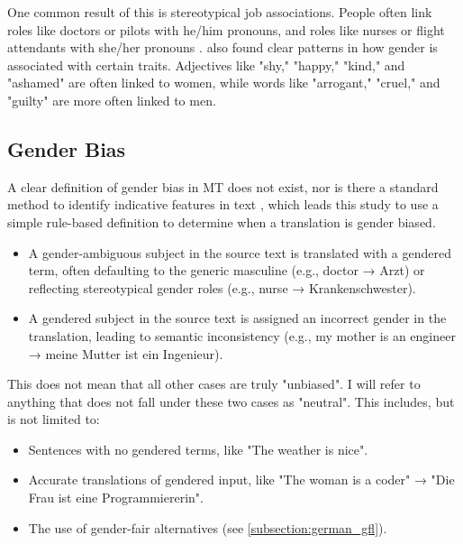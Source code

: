         One common result of this is stereotypical job associations. People often link roles like doctors or pilots with he/him pronouns, and roles like nurses or flight attendants with she/her pronouns \parencite{shresthaExploringGenderBiases2022}. \textcite{pratesAssessingGenderBias2019} also found clear patterns in how gender is associated with certain traits. Adjectives like "shy," "happy," "kind," and "ashamed" are often linked to women, while words like "arrogant," "cruel," and "guilty" are more often linked to men. 

  
 \subsection{Gender Bias} \label{subsection:definition_gb}
    A clear definition of gender bias in MT does not exist, nor is there a standard method to identify indicative features in text \parencite{barclayInvestigatingMarkersDrivers2024a}, which leads this study to use a simple rule-based definition to determine when a translation is gender biased.

        \begin{itemize}
        \item A gender-ambiguous subject in the source text is translated with a gendered term, often defaulting to the generic masculine (e.g., doctor → Arzt) or reflecting stereotypical gender roles (e.g., nurse → Krankenschwester).
        \item A gendered subject in the source text is assigned an incorrect gender in the translation, leading to semantic inconsistency (e.g., my mother is an engineer → meine Mutter ist ein Ingenieur).
        \end{itemize}

    This does not mean that all other cases are truly "unbiased". I will refer to anything that does not fall under these two cases as "neutral". This includes, but is not limited to:

        \begin{itemize}
        \item Sentences with no gendered terms, like "The weather is nice".
        \item Accurate translations of gendered input, like "The woman is a coder" → "Die Frau ist eine Programmiererin".
        \item The use of gender-fair alternatives (see \autoref{subsection:german_gfl}).
        \end{itemize}

